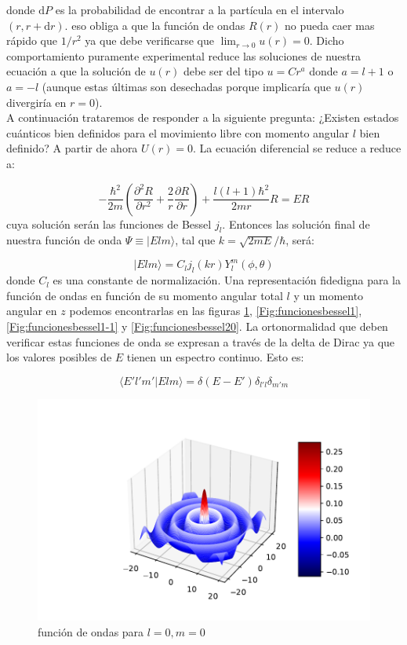 \documentclass[12pt,a4paper]{article}
\numberwithin{equation}{section}
\numberwithin{figure}{section}
\newcommand{\parentesis}[1]{\left( #1  \right)}
\newcommand{\parciales}[2]{\frac{\partial #1}{\partial #2}}
\newcommand{\D}{\mathrm{d}}
\begin{document}
donde $\D P$ es la probabilidad de encontrar a la partícula en el intervalo $(r,r+\D r)$. eso obliga a que la función de ondas $R(r)$ no pueda caer mas rápido que $1/r^2$ ya que debe verificarse que $\lim_{r \rightarrow 0} u(r) = 0$. Dicho comportamiento puramente experimental reduce las soluciones de nuestra ecuación a que la solución de $u(r)$ debe ser del tipo $u=Cr^a$ donde $a=l+1$ o $a=-l$ (aunque estas últimas son desechadas porque implicaría que $u(r)$ divergiría en $r = 0$). \\

A continuación trataremos de responder a la siguiente pregunta: ¿Existen estados cuánticos bien definidos para el movimiento libre con momento angular $l$ bien definido?  A partir de ahora $U(r)=0$. La ecuación diferencial se reduce a reduce a:

\begin{equation}
-\dfrac{\hbar^2}{2 m} \parentesis{\parciales{^2R}{r^2}+ \dfrac{2}{r} \parciales{R}{r}} + \dfrac{l(l+1) \hbar^2}{2mr} R = E R
\end{equation}
cuya solución serán las funciones de Bessel $j_l$. Entonces las solución final de nuestra función de onda $\Psi \equiv | E l m \rangle$, tal que $k = \sqrt{2mE}/\hbar$, será:

\begin{equation}
| E l m \rangle = C_l j_l (kr) Y_l^m (\phi,\theta) 
\end{equation}
donde $C_l$ es una constante de normalización. Una representación fidedigna para la función de ondas en función de su momento angular total $l$ y un momento angular en $z$ podemos encontrarlas en las  figuras \ref{Fig:funcionesbessel0}, \ref{Fig:funcionesbessel1}, \ref{Fig:funcionesbessel1-1} y \ref{Fig:funcionesbessel20}. La ortonormalidad que deben verificar estas funciones de onda se expresan a través de la delta de Dirac ya que los valores posibles de $E$ tienen un espectro continuo. Esto es:

\begin{equation}
\langle E' l' m' | E l m \rangle = \delta (E-E') \delta_{l'l} \delta_{m'm}
\end{equation}

\begin{figure}[h!] \centering
\includegraphics[scale=1]{funcionesbessel0.pdf}
\caption{función de ondas para $l=0,m=0$}
\label{Fig:funcionesbessel0}
\end{figure}
\end{document}
